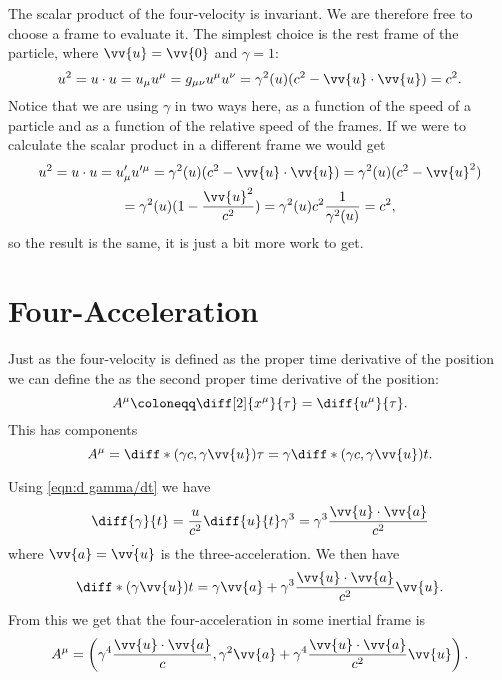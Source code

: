 \documentclass[fleqn]{NotesClass}
\begin{document}
    The scalar product of the four-velocity is invariant.
    We are therefore free to choose a frame to evaluate it.
    The simplest choice is the rest frame of the particle, where \(\vv{u} = \vv{0}\) and \(\gamma = 1\):
    \begin{equation}
        u^2 = u\cdot u = u_\mu u^\mu = g_{\mu\nu}u^\mu u^\nu = \gamma^2(u)(c^2 - \vv{u}\cdot\vv{u}) = c^2.
    \end{equation}
    Notice that we are using \(\gamma\) in two ways here, as a function of the speed of a particle and as a function of the relative speed of the frames.
    If we were to calculate the scalar product in a different frame we would get
    \begin{multline}
        u^2 = u\cdot u = u'_\mu u'^\mu = \gamma^2(u)(c^2 - \vv{u}\cdot\vv{u}) = \gamma^2(u)(c^2 - \vv{u}^2)\\
        = \gamma^2(u)(1 - \frac{\vv{u}^2}{c^2}) = \gamma^2(u)c^2 \frac{1}{\gamma^2(u)} = c^2,
    \end{multline}
    so the result is the same, it is just a bit more work to get.
    
    \section{Four-Acceleration}
    Just as the four-velocity is defined as the proper time derivative of the position we can define the  as the second proper time derivative of the position:
    \begin{equation}
        A^\mu \coloneqq \diff[2]{x^\mu}{\tau} = \diff{u^\mu}{\tau}.
    \end{equation}
    This has components
    \begin{equation}
        A^\mu = \diff*{(\gamma c, \gamma\vv{u})}{\tau} = \gamma\diff*{(\gamma c, \gamma\vv{u})}{t}.
    \end{equation}
    
    Using \cref{eqn:d gamma/dt} we have
    \begin{equation}
        \diff{\gamma}{t} = \frac{u}{c^2}\diff{u}{t}\gamma^3 = \gamma^3\frac{\vv{u}\cdot\vv{a}}{c^2}
    \end{equation}
    where \(\vv{a} = \dot{\vv{u}}\) is the three-acceleration.
    We then have
    \begin{equation}
        \diff*{(\gamma \vv{u})}{t} = \gamma\vv{a} + \gamma^3\frac{\vv{u}\cdot\vv{a}}{c^2}\vv{u}.
    \end{equation}
    From this we get that the four-acceleration in some inertial frame is
    \begin{equation}
        A^\mu = \left( \gamma^4\frac{\vv{u}\cdot\vv{a}}{c}, \gamma^2\vv{a} + \gamma^4\frac{\vv{u}\cdot\vv{a}}{c^2}\vv{u} \right).
    \end{equation}
    
\end{document}
